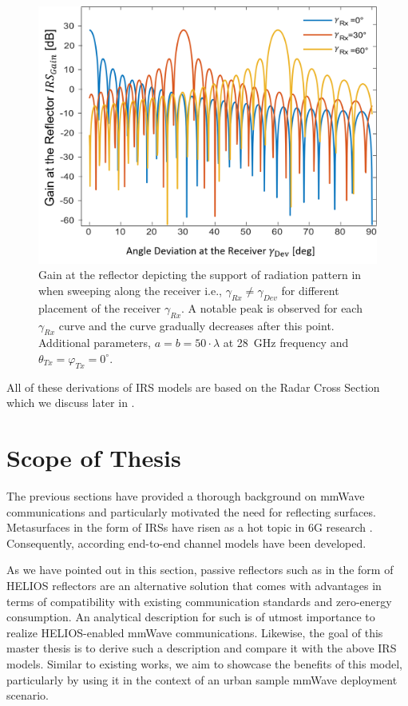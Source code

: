 \begin{figure}[tb]
	\centering
	\includegraphics[width=0.7\linewidth]{images/Section 2 Images/model1_pattern}
	\caption{Gain at the reflector depicting the support of radiation pattern in \cite{8936989} when sweeping along the receiver i.e., $\gamma_{Rx} \neq \gamma_{Dev}$ for different placement of the receiver $\gamma_{Rx}$. A notable peak is observed for each $\gamma_{Rx}$ curve and the curve gradually decreases after this point. Additional parameters, $a=b=50\cdot \lambda$ at \SI{28}{\giga\hertz} frequency and $\theta_{Tx}=\varphi_{Tx}=0^\circ$. }
	\label{fig:model1pattern}
\end{figure}

All of these derivations of \ac{IRS} models are based on the Radar Cross Section which we discuss later in . 
\section{Scope of Thesis} \label{Related Work or Scope of Thesis}
The previous sections have provided a thorough background on mmWave communications and particularly motivated the need for reflecting surfaces. Metasurfaces in the form of IRSs have risen as a hot topic in 6G research \cite{Scope_1, Scope_2, Scope_3, Scope_4}. Consequently, according end-to-end channel models have been developed.

As we have pointed out in this section, passive reflectors such as in the form of HELIOS reflectors are an alternative solution that comes with advantages in terms of compatibility with existing communication standards and zero-energy consumption. An analytical description for such is of utmost importance to realize HELIOS-enabled mmWave communications. Likewise, the goal of this master thesis is to derive such a description and compare it with the above IRS models. Similar to existing works, we aim to showcase the benefits of this model, particularly by using it in the context of an urban sample mmWave deployment scenario.